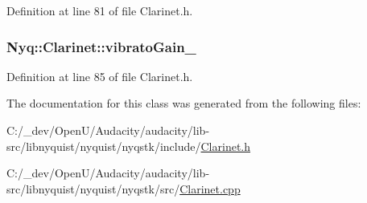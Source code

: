 Definition at line 81 of file Clarinet.\+h.

\subsubsection[{\texorpdfstring{vibrato\+Gain\+\_\+}{vibratoGain_}}]{ Nyq\+::\+Clarinet\+::vibrato\+Gain\+\_\+\hspace{0.3cm}{\ttfamily [protected]}}\hypertarget{class_nyq_1_1_clarinet_a78100db09c721747284d2518ba7d1ef4}{}\label{class_nyq_1_1_clarinet_a78100db09c721747284d2518ba7d1ef4}


Definition at line 85 of file Clarinet.\+h.



The documentation for this class was generated from the following files\+:\begin{DoxyCompactItemize}
\item 
C\+:/\+\_\+dev/\+Open\+U/\+Audacity/audacity/lib-\/src/libnyquist/nyquist/nyqstk/include/\hyperlink{_clarinet_8h}{Clarinet.\+h}\item 
C\+:/\+\_\+dev/\+Open\+U/\+Audacity/audacity/lib-\/src/libnyquist/nyquist/nyqstk/src/\hyperlink{_clarinet_8cpp}{Clarinet.\+cpp}\end{DoxyCompactItemize}
